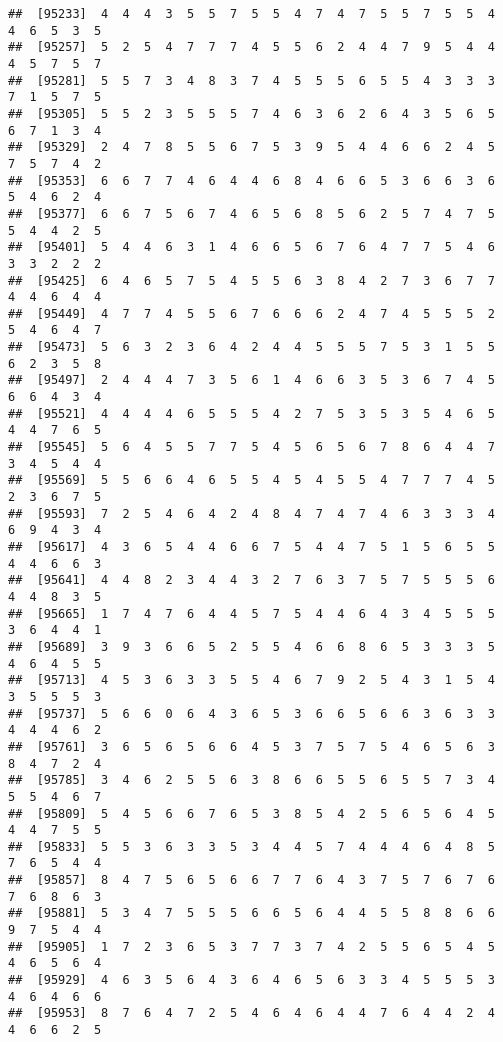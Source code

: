 \documentclass[
]{book}
\begin{document}
\begin{verbatim}
##  [95233]  4  4  4  3  5  5  7  5  5  4  7  4  7  5  5  7  5  5  4  4  6  5  3  5
##  [95257]  5  2  5  4  7  7  7  4  5  5  6  2  4  4  7  9  5  4  4  4  5  7  5  7
##  [95281]  5  5  7  3  4  8  3  7  4  5  5  5  6  5  5  4  3  3  3  7  1  5  7  5
##  [95305]  5  5  2  3  5  5  5  7  4  6  3  6  2  6  4  3  5  6  5  6  7  1  3  4
##  [95329]  2  4  7  8  5  5  6  7  5  3  9  5  4  4  6  6  2  4  5  7  5  7  4  2
##  [95353]  6  6  7  7  4  6  4  4  6  8  4  6  6  5  3  6  6  3  6  5  4  6  2  4
##  [95377]  6  6  7  5  6  7  4  6  5  6  8  5  6  2  5  7  4  7  5  5  4  4  2  5
##  [95401]  5  4  4  6  3  1  4  6  6  5  6  7  6  4  7  7  5  4  6  3  3  2  2  2
##  [95425]  6  4  6  5  7  5  4  5  5  6  3  8  4  2  7  3  6  7  7  4  4  6  4  4
##  [95449]  4  7  7  4  5  5  6  7  6  6  6  2  4  7  4  5  5  5  2  5  4  6  4  7
##  [95473]  5  6  3  2  3  6  4  2  4  4  5  5  5  7  5  3  1  5  5  6  2  3  5  8
##  [95497]  2  4  4  4  7  3  5  6  1  4  6  6  3  5  3  6  7  4  5  6  6  4  3  4
##  [95521]  4  4  4  4  6  5  5  5  4  2  7  5  3  5  3  5  4  6  5  4  4  7  6  5
##  [95545]  5  6  4  5  5  7  7  5  4  5  6  5  6  7  8  6  4  4  7  3  4  5  4  4
##  [95569]  5  5  6  6  4  6  5  5  4  5  4  5  5  4  7  7  7  4  5  2  3  6  7  5
##  [95593]  7  2  5  4  6  4  2  4  8  4  7  4  7  4  6  3  3  3  4  6  9  4  3  4
##  [95617]  4  3  6  5  4  4  6  6  7  5  4  4  7  5  1  5  6  5  5  4  4  6  6  3
##  [95641]  4  4  8  2  3  4  4  3  2  7  6  3  7  5  7  5  5  5  6  4  4  8  3  5
##  [95665]  1  7  4  7  6  4  4  5  7  5  4  4  6  4  3  4  5  5  5  3  6  4  4  1
##  [95689]  3  9  3  6  6  5  2  5  5  4  6  6  8  6  5  3  3  3  5  4  6  4  5  5
##  [95713]  4  5  3  6  3  3  5  5  4  6  7  9  2  5  4  3  1  5  4  3  5  5  5  3
##  [95737]  5  6  6  0  6  4  3  6  5  3  6  6  5  6  6  3  6  3  3  4  4  4  6  2
##  [95761]  3  6  5  6  5  6  6  4  5  3  7  5  7  5  4  6  5  6  3  8  4  7  2  4
##  [95785]  3  4  6  2  5  5  6  3  8  6  6  5  5  6  5  5  7  3  4  5  5  4  6  7
##  [95809]  5  4  5  6  6  7  6  5  3  8  5  4  2  5  6  5  6  4  5  4  4  7  5  5
##  [95833]  5  5  3  6  3  3  5  3  4  4  5  7  4  4  4  6  4  8  5  7  6  5  4  4
##  [95857]  8  4  7  5  6  5  6  6  7  7  6  4  3  7  5  7  6  7  6  7  6  8  6  3
##  [95881]  5  3  4  7  5  5  5  6  6  5  6  4  4  5  5  8  8  6  6  9  7  5  4  4
##  [95905]  1  7  2  3  6  5  3  7  7  3  7  4  2  5  5  6  5  4  5  4  6  5  6  4
##  [95929]  4  6  3  5  6  4  3  6  4  6  5  6  3  3  4  5  5  5  3  4  6  4  6  6
##  [95953]  8  7  6  4  7  2  5  4  6  4  6  4  4  7  6  4  4  2  4  4  6  6  2  5

\end{verbatim}
\end{document}
